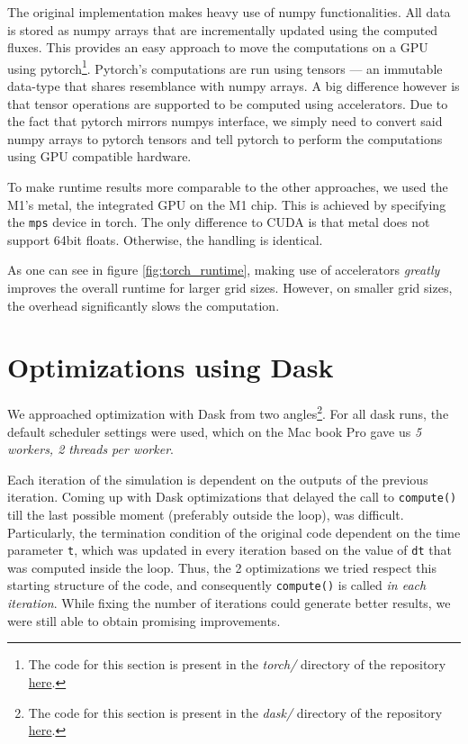 \documentclass[a4paper,10pt]{article}
\begin{document}
The original implementation makes heavy use of numpy functionalities.
All data is stored as numpy arrays that are incrementally updated using the computed fluxes.
This provides an easy approach to move the computations on a GPU using pytorch\footnote{The code for this section is present in the \textit{torch/} directory of the repository \href{https://github.com/paulmyr/DD2358-HPC25/blob/master/10_project_rishi_paul/code/torch/runtimeplots_with_gpu.py}{here}.}.
Pytorch's computations are run using tensors --- an immutable data-type that shares resemblance with numpy arrays.
A big difference however is that tensor operations are supported to be computed using accelerators.
Due to the fact that pytorch mirrors numpys interface, we simply need to convert said numpy arrays to pytorch tensors
and tell pytorch to perform the computations using GPU compatible hardware.

To make runtime results more comparable to the other approaches, we used the M1's metal, the integrated GPU on the M1 chip.
This is achieved by specifying the \verb|mps| device in torch.
The only difference to CUDA is that metal does not support 64bit floats.
Otherwise, the handling is identical.

As one can see in figure \ref{fig:torch_runtime}, making use of accelerators \emph{greatly} improves the overall runtime for larger grid sizes.
However, on smaller grid sizes, the overhead significantly slows the computation.

\section{Optimizations using Dask}
We approached optimization with Dask from two angles\footnote{The code for this section is present in the \textit{dask/} directory of the repository \href{https://github.com/paulmyr/DD2358-HPC25/blob/master/10_project_rishi_paul/code/dask/}{here}.}.
For all dask runs, the default scheduler settings were used, which on the Mac book Pro gave us \emph{5 workers, 2 threads per worker}.

Each iteration of the simulation is dependent on the outputs of the previous iteration.
Coming up with Dask optimizations that delayed the call to \verb|compute()| till the last possible moment (preferably outside the loop), was difficult.
Particularly, the termination condition of the original code dependent on the time parameter \verb|t|, which was updated in every iteration based on the value of \verb|dt| that was computed inside the loop.
Thus, the 2 optimizations we tried respect this starting structure of the code, and consequently \verb|compute()| is called \emph{in each iteration}.
While fixing the number of iterations could generate better results, we were still able to obtain promising improvements.
\end{document}
